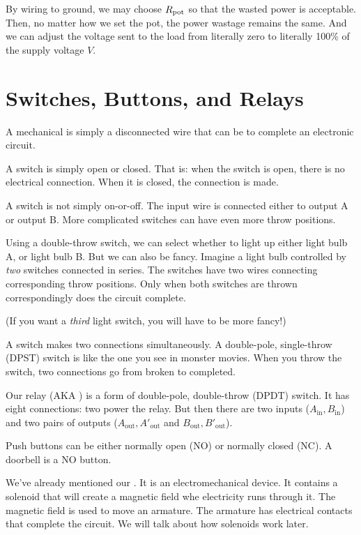 \documentclass[11pt, oneside]{amsart}
\begin{document}
By wiring to ground, we may choose $R_\text{pot}$ so that the wasted power is
acceptable. Then, no matter how we set the pot, the power wastage
remains the same. And we can adjust the voltage sent to the load from
literally zero to literally 100\% of the supply voltage $V$.

\section{Switches, Buttons, and Relays}

A mechanical  is simply a disconnected wire that can be
 to complete an electronic circuit.

A  switch is simply open or closed. That is: when
the switch is open, there is no electrical connection. When it is
closed, the connection is made.

A  switch is not simply on-or-off. The input wire
is connected either to output A or output B. More complicated switches
can have even more throw positions.

Using a double-throw switch, we can select whether to light up either
light bulb A, or light bulb B. But we can also be fancy. Imagine a light
bulb controlled by \emph{two} switches connected in series. The switches
have two wires connecting corresponding throw positions. Only when both
switches are thrown correspondingly does the circuit complete.

(If you want a \emph{third} light switch, you will have to be more
fancy!)

A  switch makes two connections simultaneously. A
double-pole, single-throw (DPST) switch is like the one you see in
monster movies. When you throw the switch, two connections go from
broken to completed.

\newcommand{\Ain}{A_\text{in}}
\newcommand{\Bin}{B_\text{in}}
\newcommand{\Aout}{A_\text{out}}
\newcommand{\Apout}{A'_\text{out}}
\newcommand{\Bout}{B_\text{out}}
\newcommand{\Bpout}{B'_\text{out}}

Our relay (AKA ) is a form of double-pole, double-throw
(DPDT) switch. It has eight connections: two power the relay. But then
there are two inputs ($\Ain, \Bin$) and two pairs of outputs ($\Aout,
\Apout$ and $\Bout, \Bpout$).

Push buttons can be either normally open (NO) or normally closed (NC).
A doorbell is a NO button.

We've already mentioned our . It is an electromechanical
device. It contains a solenoid that will create a magnetic field whe
electricity runs through it. The magnetic field is used to move an
armature. The armature has electrical contacts that complete the
circuit. We will talk about how solenoids work later.
\end{document}
